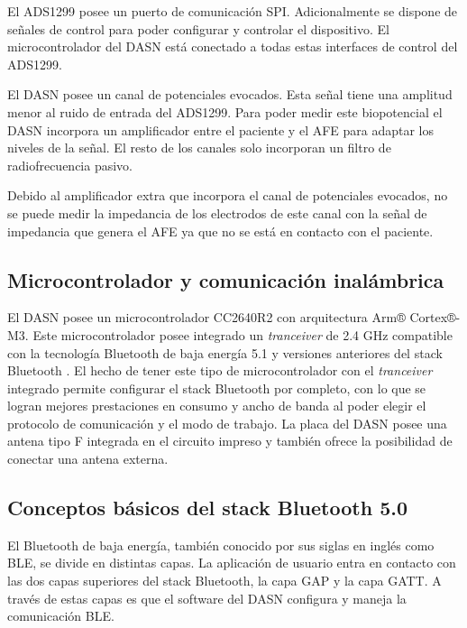 El ADS1299 posee un puerto de comunicación SPI. Adicionalmente se dispone de señales de control para poder configurar y controlar el dispositivo. El microcontrolador del DASN está conectado a todas estas interfaces de control del ADS1299.

El DASN posee un canal de potenciales evocados. Esta señal tiene una amplitud menor al ruido de entrada del ADS1299. Para poder medir este biopotencial el DASN incorpora un amplificador entre el paciente y el AFE para adaptar los niveles de la señal. El resto de los canales solo incorporan un filtro de radiofrecuencia pasivo. 

Debido al amplificador extra que incorpora el canal de potenciales evocados, no se puede medir la impedancia de los electrodos de este canal con la señal de impedancia que genera el AFE ya que no se está en contacto con el paciente.

\subsection{Microcontrolador y comunicación inalámbrica}
El DASN posee un microcontrolador CC2640R2 con arquitectura Arm® Cortex®-M3. Este microcontrolador posee integrado un \textit{tranceiver} de 2.4 GHz compatible con la tecnología Bluetooth de baja energía 5.1 y versiones anteriores del stack Bluetooth \citep{PAPER:STACKBLE}. El hecho de tener este tipo de microcontrolador con el \textit{tranceiver} integrado permite configurar el stack Bluetooth por completo, con lo que se logran mejores prestaciones en consumo y ancho de banda al poder elegir el protocolo de comunicación y el modo de trabajo. La placa del DASN posee una antena tipo F \citep{PAPER:ANTENAF} integrada en el circuito impreso y también ofrece la posibilidad de conectar una antena externa. 

\subsection{Conceptos básicos del stack Bluetooth 5.0}
\label{subsec:ConceptosBLE}
El Bluetooth de baja energía, también conocido por sus siglas en inglés como BLE, se divide en distintas capas. La aplicación de usuario entra en contacto con las dos capas superiores del stack Bluetooth, la capa GAP y la capa GATT. A través de estas capas es que el software del DASN configura y maneja la comunicación BLE.

